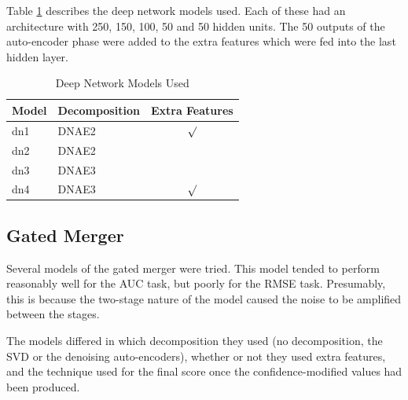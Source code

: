 \documentclass{article}
\begin{document}
Table \ref{table:deep-net-models} describes the deep network models used.  Each of these had an architecture with 250, 150, 100, 50 and 50 hidden units.  The 50 outputs of the auto-encoder phase were added to the extra features which were fed into the last hidden layer.

\begin{table}
\caption{Deep Network Models Used}
\label{table:deep-net-models}
\vskip 0.15in
\begin{center}
\begin{small}
\begin{sc}
\begin{tabular}{llc}
\hline
\abovespace\belowspace
Model & Decomposition & Extra Features \\
\hline
\abovespace
dn1   & DNAE2  & $\surd$  \\
dn2   & DNAE2  &   \\
dn3   & DNAE3  &   \\
\belowspace
dn4   & DNAE3  & $\surd$  \\
\hline
\end{tabular}
\end{sc}
\end{small}
\end{center}
\vskip -0.1in
\end{table}


\subsection{Gated Merger}

Several models of the gated merger were tried.  This model tended to perform reasonably well for the AUC task, but poorly for the RMSE task.  Presumably, this is because the two-stage nature of the model caused the noise to be amplified between the stages.

The models differed in which decomposition they used (no decomposition, the SVD or the denoising auto-encoders), whether or not they used extra features, and the technique used for the final score once the confidence-modified values had been produced.
\end{document}
